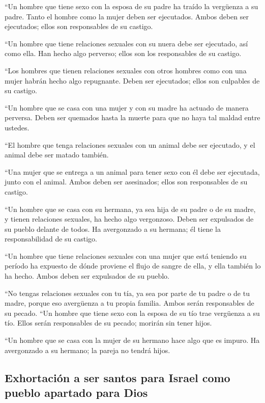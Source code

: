  ``Un hombre que tiene sexo con la esposa de su padre ha
traído la vergüenza a su padre. Tanto el hombre como la mujer deben ser
ejecutados. Ambos deben ser ejecutados; ellos son responsables de su
castigo.

 ``Un hombre que tiene relaciones sexuales con su nuera
debe ser ejecutado, así como ella. Han hecho algo perverso; ellos son
los responsables de su castigo.

 ``Los hombres que tienen relaciones sexuales con otros
hombres como con una mujer habrán hecho algo repugnante. Deben ser
ejecutados; ellos son culpables de su castigo.

 ``Un hombre que se casa con una mujer y con su madre ha
actuado de manera perversa. Deben ser quemados hasta la muerte para que
no haya tal maldad entre ustedes.

 ``El hombre que tenga relaciones sexuales con un animal
debe ser ejecutado, y el animal debe ser matado también.

 ``Una mujer que se entrega a un animal para tener sexo
con él debe ser ejecutada, junto con el animal. Ambos deben ser
asesinados; ellos son responsables de su castigo.

 ``Un hombre que se casa con su hermana, ya sea hija de
su padre o de su madre, y tienen relaciones sexuales, ha hecho algo
vergonzoso. Deben ser expulsados de su pueblo delante de todos. Ha
avergonzado a su hermana; él tiene la responsabilidad de su castigo.

 ``Un hombre que tiene relaciones sexuales con una mujer
que está teniendo su período ha expuesto de dónde proviene el flujo de
sangre de ella, y ella también lo ha hecho. Ambos deben ser expulsados
de su pueblo.

 ``No tengas relaciones sexuales con tu tía, ya sea por
parte de tu padre o de tu madre, porque eso avergüenza a tu propia
familia. Ambos serán responsables de su pecado.  ``Un
hombre que tiene sexo con la esposa de su tío trae vergüenza a su tío.
Ellos serán responsables de su pecado; morirán sin tener hijos.

 ``Un hombre que se casa con la mujer de su hermano hace
algo que es impuro. Ha avergonzado a su hermano; la pareja no tendrá
hijos.

\hypertarget{exhortaciuxf3n-a-ser-santos-para-israel-como-pueblo-apartado-para-dios}{%
\subsection{Exhortación a ser santos para Israel como pueblo apartado
para
Dios}\label{exhortaciuxf3n-a-ser-santos-para-israel-como-pueblo-apartado-para-dios}}

